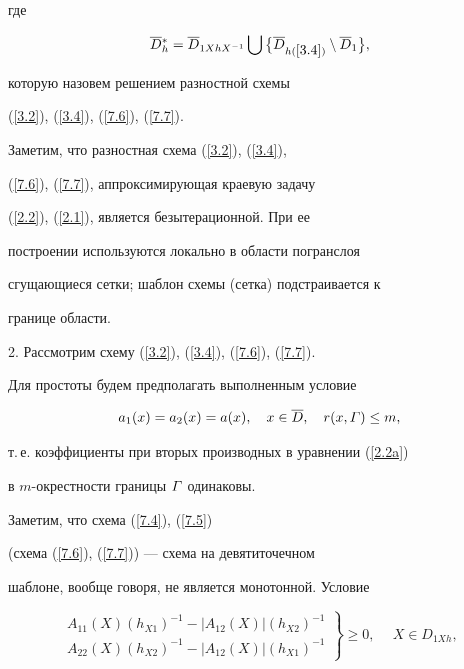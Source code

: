 где


$$


\Db{}_h^{*}= \Db_{1XhX^{-1}} \bigcup \big\{


\Db_{h(\ref{3.4})}\setminus \Db_1 \big\},


$$


которую назовем решением разностной схемы


(\ref{3.2}), (\ref{3.4}), (\ref{7.6}), (\ref{7.7}).





Заметим, что разностная схема (\ref{3.2}), (\ref{3.4}),


(\ref{7.6}), (\ref{7.7}), аппроксимирующая краевую задачу


(\ref{2.2}), (\ref{2.1}), является безытерационной. При ее


построении используются локально  в области погранслоя


сгущающиеся сетки; шаблон схемы (сетка) подстраивается к


границе области.


\medskip





2. Рассмотрим схему (\ref{3.2}), (\ref{3.4}), (\ref{7.6}), (\ref{7.7}).


Для простоты будем предполагать  выполненным условие


\begin{equation} \label{7.9}


a_1(x)=a_2(x)=a(x), \quad x\in\Db, \quad r(x,\G)\le m,


\end{equation}


т.\,е. коэффициенты при вторых производных в уравнении (\ref{2.2a})


в $m$-окрестности границы $\varGamma$ одинаковы.





Заметим, что схема (\ref{7.4}), (\ref{7.5})


(схема (\ref{7.6}), (\ref{7.7})) --- схема на девятиточечном


шаблоне, вообще говоря, не является монотонной. Условие


\begin{equation} \label{7.10}


\left.


\begin{array}{c}


A_{11}(X)(h_{X1})^{-1}- |A_{12}(X)|(h_{X2})^{-1} \\[2mm]


A_{22}(X)(h_{X2})^{-1}- |A_{12}(X)|(h_{X1})^{-1}


\end{array}


\right\}


\ge 0, \quad \ X\in D_{1Xh},


\end{equation}


